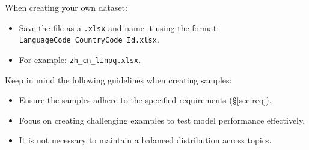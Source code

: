 \documentclass[11pt]{article}
\begin{document}
\noindent When creating your own dataset:
\begin{itemize}
    \item Save the file as a \texttt{.xlsx} and name it using the format: \texttt{LanguageCode\_CountryCode\_Id.xlsx}. 
    \item For example: \texttt{zh\_cn\_linpq.xlsx}.
\end{itemize}

\noindent Keep in mind the following guidelines when creating samples:
\begin{itemize}
    \item Ensure the samples adhere to the specified requirements (\S\ref{sec:req}).
    \item Focus on creating challenging examples to test model performance effectively.
    \item It is not necessary to maintain a balanced distribution across topics.
\end{itemize}

% 
\end{document}
